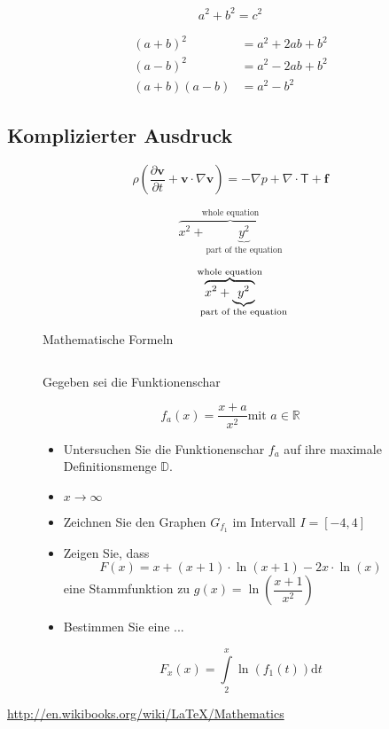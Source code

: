 \documentclass[10pt, a4paper]{article}
\numberwithin{equation}{section}
\numberwithin{figure}{section}
\begin{document}
\begin{equation}
 	a^2 + b^2 = c^2\label{eq:a}
\end{equation}


\begin{align}
  (a+b)^2    &=    a^2+2ab+b^2 \nonumber \\
  (a-b)^2    &=    a^2-2ab+b^2 \nonumber \\
  (a+b)(a-b) &=    a^2-b^2
\end{align}

\subsection{Komplizierter Ausdruck}
\begin{figure}[h]
\[ \rho\left( \frac{\partial \mathbf{v}}{\partial t} + \mathbf{v}\cdot\nabla\mathbf{v}\right) = -\nabla p + \nabla\cdot\mathsf{T}+\mathbf{f} \]

\[ \overbrace{x^2 + \underbrace{y^2}_\text{part of the equation}}^\text{whole equation} \]

\[ \overbrace{x^2 + \underbrace{y^2}_{\mathclap{\text{part of the equation}}}}^{{\text{whole equation}}} \]
\caption{Mathematische Formeln}
\end{figure}

\begin{equation}
[]
\end{equation}

\begin{figure}
Gegeben sei die Funktionenschar

\[ f_a(x) = \frac{x+a}{x^2} \text{mit } a \in \mathbb{R} \]

\begin{itemize}
\item Untersuchen Sie die Funktionenschar \( f_a \) auf ihre maximale Definitionsmenge \( \mathbb{D} \).
\item \( x \to \infty \)
\item Zeichnen Sie den Graphen \( G_{f_1} \) im Intervall \( I = [-4,4] \)
\item Zeigen Sie, dass 
\[ F(x) = x+ (x+1)\cdot\ln(x+1)-2x\cdot\ln(x) \]
eine Stammfunktion zu \( g(x) = \ln\left(\dfrac{x+1}{x^2}\right) \)
\item Bestimmen Sie eine ...

\[ F_x(x) = \int\limits_2^x\ln\left(f_1(t)\right)\mathrm{d}t \]

\end{itemize}
\end{figure}

\url{http://en.wikibooks.org/wiki/LaTeX/Mathematics}
\end{document}
